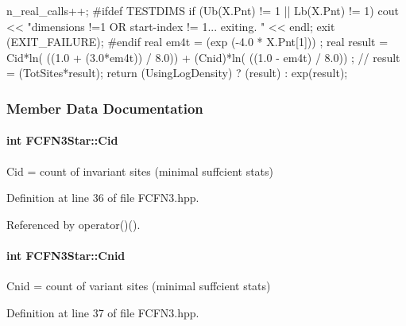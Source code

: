 \begin{DoxyCode}
{
  n_real_calls++;
  #ifdef TESTDIMS
  if (Ub(X.Pnt) != 1 || Lb(X.Pnt) != 1)
  {
    cout << "dimensions !=1 OR start-index != 1... exiting. " 
         << endl; exit (EXIT_FAILURE);
  }
  #endif
  real em4t = (exp (-4.0 * X.Pnt[1])) ;
  real result = Cid*ln( ((1.0 + (3.0*em4t)) / 8.0)) + 
                (Cnid)*ln( ((1.0 - em4t) / 8.0)) ;
  // result = (TotSites*result);
  return (UsingLogDensity) ? (result) : exp(result);
}
\end{DoxyCode}


\subsubsection{\-Member \-Data \-Documentation}
\hypertarget{classFCFN3Star_a75abf79fc92c2683219829ce86a43a77}{
\paragraph[{\-Cid}]{\setlength{\rightskip}{0pt plus 5cm}int {\bf \-F\-C\-F\-N3\-Star\-::\-Cid}}}\label{classFCFN3Star_a75abf79fc92c2683219829ce86a43a77}


\-Cid = count of invariant sites (minimal suffcient stats) 



\-Definition at line 36 of file \-F\-C\-F\-N3.\-hpp.



\-Referenced by operator()().

\hypertarget{classFCFN3Star_ace3c43e5c025a8cd9976ce78202fa542}{
\paragraph[{\-Cnid}]{\setlength{\rightskip}{0pt plus 5cm}int {\bf \-F\-C\-F\-N3\-Star\-::\-Cnid}}}\label{classFCFN3Star_ace3c43e5c025a8cd9976ce78202fa542}


\-Cnid = count of variant sites (minimal suffcient stats) 



\-Definition at line 37 of file \-F\-C\-F\-N3.\-hpp.



